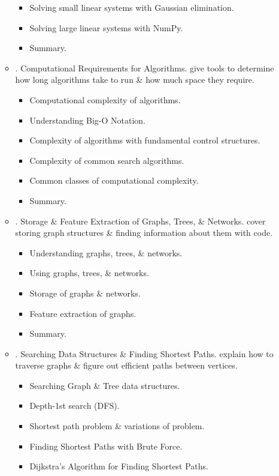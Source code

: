 \documentclass{article}
\begin{document}
\begin{enumerate}
\begin{itemize}
\begin{itemize}
			\item {\sf Solving small linear systems with Gaussian elimination.}
			\item {\sf Solving large linear systems with NumPy.}
			\item {\sf Summary.}
		\end{itemize}
		\item {. Computational Requirements for Algorithms.} give tools to determine how long algorithms take to run \& how much space they require.
		\begin{itemize}
			\item {\sf Computational complexity of algorithms.}
			\item {\sf Understanding Big-O Notation.}
			\item {\sf Complexity of algorithms with fundamental control structures.}
			\item {\sf Complexity of common search algorithms.}
			\item {\sf Common classes of computational complexity.}
			\item {\sf Summary.}
		\end{itemize}
		\item {. Storage \& Feature Extraction of Graphs, Trees, \& Networks.} cover storing graph structures \& finding information about them with code.
		\begin{itemize}
			\item {\sf Understanding graphs, trees, \& networks.}
			\item {\sf Using graphs, trees, \& networks.}
			\item {\sf Storage of graphs \& networks.}
			\item {\sf Feature extraction of graphs.}
			\item {\sf Summary.}
		\end{itemize}
		\item {. Searching Data Structures \& Finding Shortest Paths.} explain how to traverse graphs \& figure out efficient paths between vertices.
		\begin{itemize}
			\item {\sf Searching Graph \& Tree data structures.}
			\item {\sf Depth-1st search (DFS).}
			\item {\sf Shortest path problem \& variations of problem.}
			\item {\sf Finding Shortest Paths with Brute Force.}
			\item {\sf Dijkstra's Algorithm for Finding Shortest Paths.}

\end{itemize}
\end{itemize}
\end{enumerate}
\end{document}
